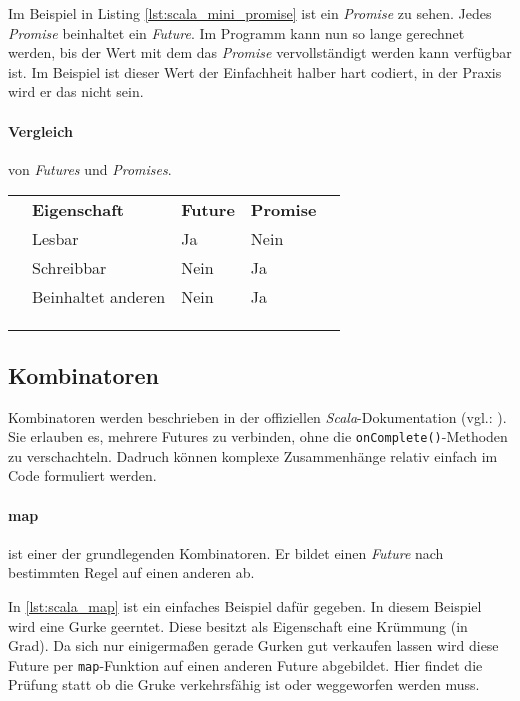Im Beispiel in Listing \ref{lst:scala_mini_promise} ist ein \emph{Promise} zu sehen.
Jedes \emph{Promise} beinhaltet ein \emph{Future}. Im Programm kann
nun so lange gerechnet werden, bis der Wert mit dem das \emph{Promise}
vervollständigt werden kann verfügbar ist. Im Beispiel ist dieser
Wert der Einfachheit halber hart codiert, in der Praxis wird er das
nicht sein.

\paragraph{Vergleich} von \emph{Futures} und \emph{Promises}.

\begin{table}[h]
\begin{tabular}{lllll}
 & \textbf{Eigenschaft} & \textbf{Future} & \textbf{Promise} &  \\
 & Lesbar & Ja & Nein &  \\
 & Schreibbar & Nein & Ja &  \\
 & Beinhaltet anderen & Nein & Ja &  \\
 &  &  &  &  \\
 &  &  &  &  \\
 &  &  &  & 
\end{tabular}
\end{table}

\subsection{Kombinatoren}

Kombinatoren werden beschrieben in der offiziellen \emph{Scala}-Dokumentation (vgl.: \cite{scalaDokuFP}).
Sie erlauben es, mehrere Futures zu verbinden, ohne die \texttt{onComplete()}-Methoden
zu verschachteln. Dadruch können komplexe Zusammenhänge relativ einfach
im Code formuliert werden.

\paragraph{map} ist einer der grundlegenden Kombinatoren. Er bildet
einen \emph{Future} nach bestimmten Regel auf einen anderen ab.

In \ref{lst:scala_map} ist ein einfaches Beispiel dafür gegeben.
In diesem Beispiel wird eine Gurke geerntet. Diese besitzt als
Eigenschaft eine Krümmung (in Grad). Da sich nur einigermaßen gerade
Gurken gut verkaufen lassen wird diese Future per \texttt{map}-Funktion
auf einen anderen Future abgebildet. Hier findet die Prüfung statt ob
die Gruke verkehrsfähig ist oder weggeworfen werden muss.

